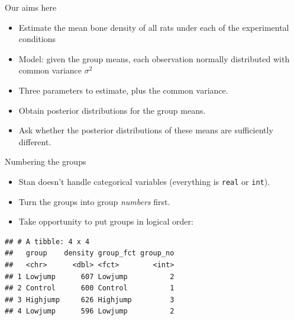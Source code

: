 \documentclass[
  ignorenonframetext,
]{beamer}
\newenvironment{Shaded}{\begin{snugshade}}{\end{snugshade}}
\newcommand{\DataTypeTok}[1]{\textcolor[rgb]{0.13,0.29,0.53}{#1}}
\newcommand{\DecValTok}[1]{\textcolor[rgb]{0.00,0.00,0.81}{#1}}
\newcommand{\KeywordTok}[1]{\textcolor[rgb]{0.13,0.29,0.53}{\textbf{#1}}}
\newcommand{\NormalTok}[1]{#1}
\newcommand{\OperatorTok}[1]{\textcolor[rgb]{0.81,0.36,0.00}{\textbf{#1}}}
\newcommand{\StringTok}[1]{\textcolor[rgb]{0.31,0.60,0.02}{#1}}
\providecommand{\tightlist}{%
  \setlength{\itemsep}{0pt}\setlength{\parskip}{0pt}}
\begin{document}
\begin{frame}{Our aims here}
\protect\hypertarget{our-aims-here}{}

\begin{itemize}
\tightlist
\item
  Estimate the mean bone density of all rats under each of the
  experimental conditions
\item
  Model: given the group means, each observation normally distributed
  with common variance \(\sigma^2\)
\item
  Three parameters to estimate, plus the common variance.
\item
  Obtain posterior distributions for the group means.
\item
  Ask whether the posterior distributions of these means are
  sufficiently different.
\end{itemize}

\end{frame}

\begin{frame}[fragile]{Numbering the groups}
\protect\hypertarget{numbering-the-groups}{}

\begin{itemize}
\tightlist
\item
  Stan doesn't handle categorical variables (everything is \texttt{real}
  or \texttt{int}).
\item
  Turn the groups into group \emph{numbers} first.
\item
  Take opportunity to put groups in logical order:
\end{itemize}

\begin{Shaded}
\end{Shaded}

\begin{verbatim}
## # A tibble: 4 x 4
##   group    density group_fct group_no
##   <chr>      <dbl> <fct>        <int>
## 1 Lowjump      607 Lowjump          2
## 2 Control      600 Control          1
## 3 Highjump     626 Highjump         3
## 4 Lowjump      596 Lowjump          2
\end{verbatim}

\end{frame}
\end{document}
